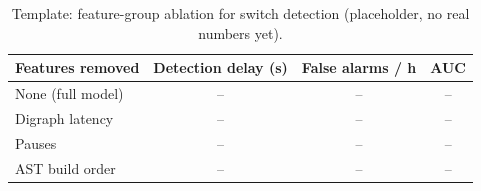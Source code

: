 \begin{table}[ht]
  \centering
  \caption{Template: feature-group ablation for switch detection
    (placeholder, no real numbers yet).}
  \label{tab:ablation-example}
  \begin{tabular}{@{}lccc@{}}
    \toprule
    Features removed & Detection delay (s) & False alarms / h & AUC \\
    \midrule
    None (full model)  & -- & -- & -- \\
    Digraph latency    & -- & -- & -- \\
    Pauses             & -- & -- & -- \\
    AST build order    & -- & -- & -- \\
    \bottomrule
  \end{tabular}
\end{table}
